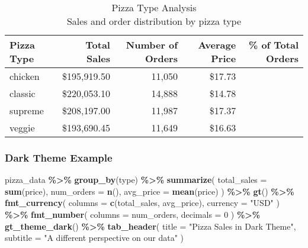 \documentclass[
]{article}
\newenvironment{Shaded}{\begin{snugshade}}{\end{snugshade}}
\newcommand{\AttributeTok}[1]{\textcolor[rgb]{0.13,0.29,0.53}{#1}}
\newcommand{\DecValTok}[1]{\textcolor[rgb]{0.00,0.00,0.81}{#1}}
\newcommand{\FunctionTok}[1]{\textcolor[rgb]{0.13,0.29,0.53}{\textbf{#1}}}
\newcommand{\NormalTok}[1]{#1}
\newcommand{\SpecialCharTok}[1]{\textcolor[rgb]{0.81,0.36,0.00}{\textbf{#1}}}
\newcommand{\StringTok}[1]{\textcolor[rgb]{0.31,0.60,0.02}{#1}}
\begin{document}
\begin{table}[!t]
\caption*{
{\large Pizza Type Analysis} \\ 
{\small Sales and order distribution by pizza type}
} 
\fontsize{12.0pt}{14.4pt}\selectfont
\begin{tabular*}{\linewidth}{@{\extracolsep{\fill}}lrrrr}
\toprule
Pizza Type & Total Sales & Number of Orders & Average Price & \% of Total Orders \\ 
\midrule\addlinespace[2.5pt]
chicken & \$195,919.50 & 11,050 & \$17.73 & {\cellcolor[HTML]{FFFFFF}{\textcolor[HTML]{000000}{22.3\%}}} \\ 
classic & \$220,053.10 & 14,888 & \$14.78 & {\cellcolor[HTML]{4682B4}{\textcolor[HTML]{FFFFFF}{30.0\%}}} \\ 
supreme & \$208,197.00 & 11,987 & \$17.37 & {\cellcolor[HTML]{D4DFED}{\textcolor[HTML]{000000}{24.2\%}}} \\ 
veggie & \$193,690.45 & 11,649 & \$16.63 & {\cellcolor[HTML]{E4EAF3}{\textcolor[HTML]{000000}{23.5\%}}} \\ 
\bottomrule
\end{tabular*}
\end{table}

\subsubsection{Dark Theme Example}\label{dark-theme-example}

\begin{Shaded}
\begin{Highlighting}[]
\NormalTok{pizza\_data }\SpecialCharTok{\%\textgreater{}\%}
  \FunctionTok{group\_by}\NormalTok{(type) }\SpecialCharTok{\%\textgreater{}\%}
  \FunctionTok{summarize}\NormalTok{(}
    \AttributeTok{total\_sales =} \FunctionTok{sum}\NormalTok{(price),}
    \AttributeTok{num\_orders =} \FunctionTok{n}\NormalTok{(),}
    \AttributeTok{avg\_price =} \FunctionTok{mean}\NormalTok{(price)}
\NormalTok{  ) }\SpecialCharTok{\%\textgreater{}\%}
  \FunctionTok{gt}\NormalTok{() }\SpecialCharTok{\%\textgreater{}\%}
  \FunctionTok{fmt\_currency}\NormalTok{(}
    \AttributeTok{columns =} \FunctionTok{c}\NormalTok{(total\_sales, avg\_price),}
    \AttributeTok{currency =} \StringTok{"USD"}
\NormalTok{  ) }\SpecialCharTok{\%\textgreater{}\%}
  \FunctionTok{fmt\_number}\NormalTok{(}
    \AttributeTok{columns =}\NormalTok{ num\_orders,}
    \AttributeTok{decimals =} \DecValTok{0}
\NormalTok{  ) }\SpecialCharTok{\%\textgreater{}\%}
  \FunctionTok{gt\_theme\_dark}\NormalTok{() }\SpecialCharTok{\%\textgreater{}\%}
  \FunctionTok{tab\_header}\NormalTok{(}
    \AttributeTok{title =} \StringTok{"Pizza Sales in Dark Theme"}\NormalTok{,}
    \AttributeTok{subtitle =} \StringTok{"A different perspective on our data"}
\NormalTok{  )}
\end{Highlighting}
\end{Shaded}
\end{document}
